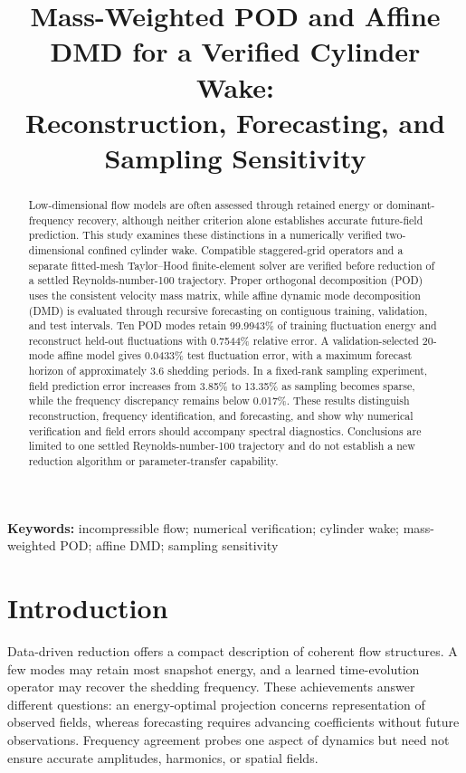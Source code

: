 \documentclass[11pt,a4paper]{article}
\title{Mass-Weighted POD and Affine DMD for a Verified Cylinder Wake:\\Reconstruction, Forecasting, and Sampling Sensitivity}
\author{}\date{}
\begin{document}
\maketitle\vspace{-15mm}
\begin{abstract}
Low-dimensional flow models are often assessed through retained energy or dominant-frequency recovery, although neither criterion alone establishes accurate future-field prediction. This study examines these distinctions in a numerically verified two-dimensional confined cylinder wake. Compatible staggered-grid operators and a separate fitted-mesh Taylor--Hood finite-element solver are verified before reduction of a settled Reynolds-number-100 trajectory. Proper orthogonal decomposition (POD) uses the consistent velocity mass matrix, while affine dynamic mode decomposition (DMD) is evaluated through recursive forecasting on contiguous training, validation, and test intervals. Ten POD modes retain 99.9943\% of training fluctuation energy and reconstruct held-out fluctuations with 0.7544\% relative error. A validation-selected 20-mode affine model gives 0.0433\% test fluctuation error, with a maximum forecast horizon of approximately 3.6 shedding periods. In a fixed-rank sampling experiment, field prediction error increases from 3.85\% to 13.35\% as sampling becomes sparse, while the frequency discrepancy remains below 0.017\%. These results distinguish reconstruction, frequency identification, and forecasting, and show why numerical verification and field errors should accompany spectral diagnostics. Conclusions are limited to one settled Reynolds-number-100 trajectory and do not establish a new reduction algorithm or parameter-transfer capability.
\end{abstract}
\noindent\textbf{Keywords:} incompressible flow; numerical verification; cylinder wake; mass-weighted POD; affine DMD; sampling sensitivity

\section{Introduction}
Data-driven reduction offers a compact description of coherent flow structures. A few modes may retain most snapshot energy, and a learned time-evolution operator may recover the shedding frequency. These achievements answer different questions: an energy-optimal projection concerns representation of observed fields, whereas forecasting requires advancing coefficients without future observations. Frequency agreement probes one aspect of dynamics but need not ensure accurate amplitudes, harmonics, or spatial fields.
\end{document}
